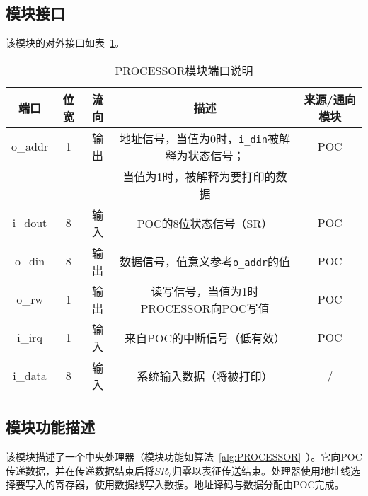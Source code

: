 \documentclass[lang=cn,a4paper,newtx]{elegantpaper}
\begin{document}
\subsection{模块接口}
该模块的对外接口如表~\ref{tab:port_description_cpu}。
\begin{table}[htbp]
    \centering
    \renewcommand{\arraystretch}{1.2} %
    \begin{tabular}{c c c c c}
        \toprule
        端口 & 位宽 & 流向 & 描述 & 来源/通向模块 \\
        \midrule
        o\_addr  &1 & 输出 & 地址信号，当值为0时，\texttt{i\_din}被解释为状态信号；& POC \\
                & & & 当值为1时，被解释为要打印的数据 & \\
        i\_dout  & 8 & 输入 & POC的8位状态信号（SR） & POC \\
        o\_din   & 8 & 输出 & 数据信号，值意义参考\texttt{o\_addr}的值 & POC\\
        o\_rw    & 1 & 输出 & 读写信号，当值为1时PROCESSOR向POC写值 & POC \\
        i\_irq   & 1 & 输入 & 来自POC的中断信号（低有效） & POC \\
        i\_data  & 8 & 输入 & 系统输入数据（将被打印） & / \\
        \bottomrule
    \end{tabular}
    \caption{PROCESSOR模块端口说明}
    \label{tab:port_description_cpu}
\end{table}
\subsection{模块功能描述}
该模块描述了一个中央处理器（模块功能如算法~\ref{alg:PROCESSOR}~）。它向POC传递数据，并在传递数据结束后将$SR_7$归零以表征传送结束。处理器使用地址线选择要写入的寄存器，使用数据线写入数据。地址译码与数据分配由POC完成。
\end{document}

